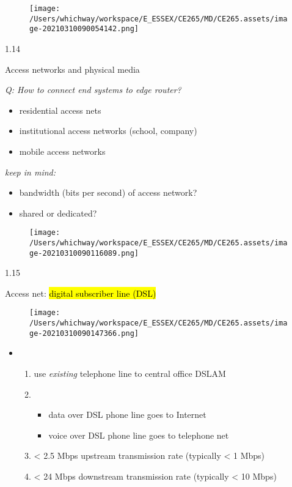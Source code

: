 \documentclass[
]{article}
\begin{document}
\begin{figure}
\centering
\texttt{[image: /Users/whichway/workspace/E\_ESSEX/CE265/MD/CE265.assets/image-20210310090054142.png]}
\caption{}
\end{figure}

1.14

Access networks and physical media

\emph{Q: How to connect end systems to edge router?}

\begin{itemize}
\item
  residential access nets
\item
  institutional access networks (school, company)
\item
  mobile access networks
\end{itemize}

\emph{keep in mind:}

\begin{itemize}
\item
  bandwidth (bits per second) of access network?
\item
  shared or dedicated?
\end{itemize}

\begin{figure}
\centering
\texttt{[image: /Users/whichway/workspace/E\_ESSEX/CE265/MD/CE265.assets/image-20210310090116089.png]}
\caption{}
\end{figure}

1.15

Access net: \hl{digital subscriber line (DSL)}

\begin{figure}
\centering
\texttt{[image: /Users/whichway/workspace/E\_ESSEX/CE265/MD/CE265.assets/image-20210310090147366.png]}
\caption{}
\end{figure}

\begin{itemize}
\item
  \begin{enumerate}
  \def\labelenumi{\arabic{enumi}.}
  \item
    use \emph{existing} telephone line to central office DSLAM
  \item
    \begin{itemize}
    \item
      data over DSL phone line goes to Internet
    \item
      voice over DSL phone line goes to telephone net
    \end{itemize}
  \item
    \textless{} 2.5 Mbps upstream transmission rate (typically
    \textless{} 1 Mbps)
  \item
    \textless{} 24 Mbps downstream transmission rate (typically
    \textless{} 10 Mbps)
  \end{enumerate}
\end{itemize}
\end{document}
